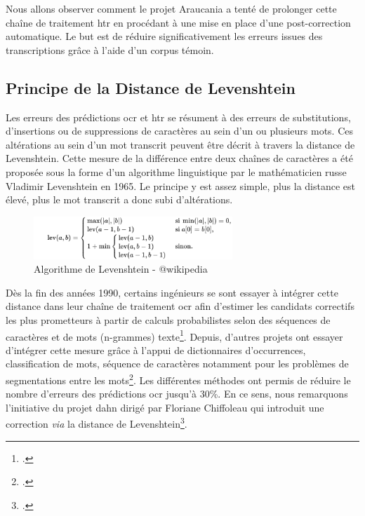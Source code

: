 	Nous allons observer comment le projet Araucania a tenté de prolonger cette chaîne de traitement \gls{htr} en procédant à une mise en place d'une post-correction automatique. Le but est de réduire significativement les erreurs issues des transcriptions grâce à l'aide d'un corpus témoin.
	
	\subsection{Principe de la Distance de Levenshtein}
	
	Les erreurs des prédictions \gls{ocr} et \gls{htr} se résument à des erreurs de substitutions, d'insertions ou de suppressions de caractères au sein d'un ou plusieurs mots. Ces altérations au sein d'un mot transcrit peuvent être décrit à travers la distance de Levenshtein. Cette mesure de la différence entre deux chaînes de caractères a été proposée sous la forme d'un algorithme linguistique par le mathématicien russe Vladimir Levenshtein en 1965. Le principe y est assez simple, plus la distance est élevé, plus le mot transcrit a donc subi d'altérations. 
	
	\begin{figure}
        \centering
        \includegraphics[width=7.5cm]{annexes/img/leventshein.png}
        \caption{Algorithme de Levenshtein - @wikipedia}
        \label{fig:algo_levenshtein}
    \end{figure}
    
    Dès la fin des années 1990, certains ingénieurs se sont essayer à intégrer cette distance dans leur chaîne de traitement \gls{ocr} afin d'estimer les candidats correctifs les plus prometteurs à partir de calculs probabilistes selon des séquences de caractères et de mots (n-grammes) texte\footcite{tongStatisticalApproachAutomatic1996}. Depuis, d'autres projets ont essayer d'intégrer cette mesure grâce à l'appui de dictionnaires d'occurrences, classification de mots, séquence de caractères notamment pour les problèmes de segmentations entre les mots\footcite{kissosOCRErrorCorrection2016, haldarLevenshteinDistanceTechnique}. Les différentes méthodes ont permis de réduire le nombre d'erreurs des prédictions \gls{ocr} jusqu'à 30\%. En ce sens, nous remarquons l'initiative du projet \gls{dahn} dirigé par Floriane Chiffoleau qui introduit une correction \textit{via} la distance de Levenshtein\footcite{chiffoleauDAHNProjectDigital2022}.
	
